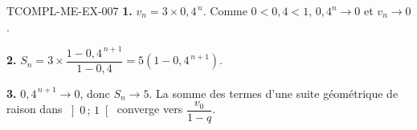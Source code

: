 \begin{corrige}{TCOMPL-ME-EX-007}
\textbf{1.} $v_n=3\times0{,}4^{\,n}$. Comme $0<0{,}4<1$, $0{,}4^n\to0$ et
$v_n\to0$.

\textbf{2.} $S_n=3\times\dfrac{1-0{,}4^{\,n+1}}{1-0{,}4}
=5\left(1-0{,}4^{\,n+1}\right)$.

\textbf{3.} $0{,}4^{\,n+1}\to0$, donc $S_n\to5$. La somme des termes d'une
suite géométrique de raison dans $\left]0\,;\,1\right[$ converge vers
$\dfrac{v_0}{1-q}$.
\end{corrige}

